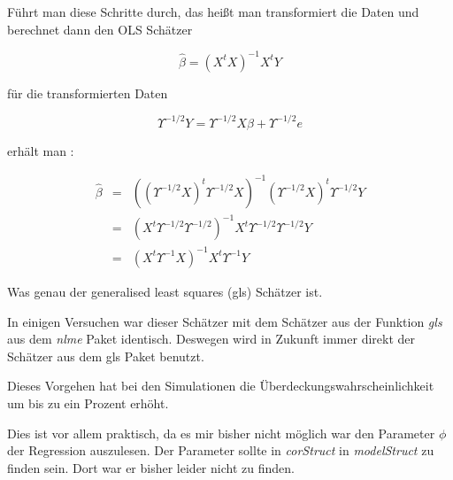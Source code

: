 \documentclass[12pt,a4paper]{article}
\theoremstyle{definition}
\theoremstyle{definition}
\theoremstyle{definition}
\theoremstyle{definition}
\begin{document}
Führt man diese Schritte durch, das heißt man transformiert die Daten und berechnet dann den OLS Schätzer 

\begin{equation*}
\hat{\beta} = (X^{t} X)^{-1} X^{t} Y
\end{equation*}

für die transformierten Daten 

\begin{equation*}
\Upsilon^{-1/2} Y = \Upsilon^{-1/2} X \beta + \Upsilon^{-1/2} e
\end{equation*}

erhält man :

\begin{eqnarray*}
\hat{\beta} &=& ((\Upsilon^{-1/2} X)^{t} \Upsilon^{-1/2} X)^{-1} (\Upsilon^{-1/2} X)^{t} \Upsilon^{-1/2} Y \\
&=& (X^{t} \Upsilon^{-1/2} \Upsilon^{-1/2})^{-1} X^{t} \Upsilon^{-1/2} \Upsilon^{-1/2} Y \\
&=& (X^{t} \Upsilon^{-1} X)^{-1} X^{t} \Upsilon^{-1} Y
\end{eqnarray*}
 
Was genau der generalised least squares (gls) Schätzer ist.

In einigen Versuchen war dieser Schätzer mit dem Schätzer aus der Funktion \textit{gls} aus dem \textit{nlme} Paket identisch. Deswegen wird in Zukunft immer direkt der Schätzer aus dem gls Paket benutzt.

Dieses Vorgehen hat bei den Simulationen die Überdeckungswahrscheinlichkeit um bis zu ein Prozent erhöht.

Dies ist vor allem praktisch, da es mir bisher nicht möglich war den Parameter $\phi$ der Regression auszulesen. Der Parameter sollte in \textit{corStruct} in \textit{modelStruct} zu finden sein. Dort war er bisher leider nicht zu finden. 
\end{document}
